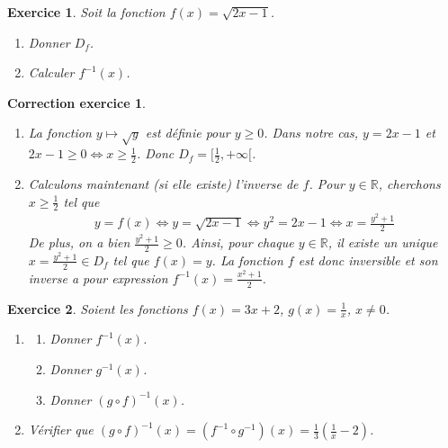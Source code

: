 \documentclass[12pt]{article}
\newtheorem{exercice}{\bf Exercice}
\newtheorem{correction}{\bf Correction exercice}
\newenvironment{exo}{
\begin{exercice}\smallskip\normalfont}{\end{exercice}
}
\newenvironment{cor}{
\begin{correction}\smallskip\normalfont}{\end{correction}
}
\newcommand*{\R}{\mathbb{R}}
\newif\ifcorrige\corrigetrue
\begin{document}


\begin{exo} Soit la fonction $f(x) = \sqrt{2x-1}$.
\begin{multicols}{2}
\begin{enumerate}
\item Donner $D_f$.
\item Calculer $f^{-1}(x)$.
\end{enumerate}
\end{multicols}
\end{exo}

\ifcorrige
\color{magenta}
\begin{cor}
  $\qquad$
\begin{enumerate}
\item La fonction $y \mapsto \sqrt{y}$ est d\'efinie pour $y \geq 0$.
  Dans notre cas, $y = 2x-1$ et $2x-1 \geq 0 \iff x \geq \frac12$.
  Donc $D_f = [ \frac12 , + \infty [$.
\item Calculons maintenant (si elle existe) l'inverse de $f$.
  Pour $y \in \R$, cherchons $x \geq \frac12$ tel que
  \begin{align*}
    y = f(x)
    \iff
    y = \sqrt{2x-1}
    \iff
    y^2 = 2x-1
    \iff
    x = \frac{y^2+1}{2}
  \end{align*}
  De plus, on a bien $\frac{y^2+1}{2} \geq 0$.
  Ainsi, pour chaque $y \in \R$, il existe un unique $x = \frac{y^2+1}{2} \in D_f$ tel que $f(x) = y$.
  La fonction $f$ est donc inversible et son inverse a pour expression $f^{-1}(x) = \frac{x^2+1}{2}$.
\end{enumerate}
\end{cor}
\color{black}
\fi


\begin{exo} Soient les fonctions $f(x) = 3x+2$, $g(x) = \frac1x$, $x \neq 0$.
\begin{enumerate}
\item 
\begin{multicols}{3}
\begin{enumerate}
\item Donner $f^{-1}(x)$.
\item Donner $g^{-1}(x)$.
\item Donner $(g \circ f)^{-1}(x)$.
\end{enumerate}
\end{multicols}
\item V\'erifier que $(g \circ f)^{-1}(x) = (f^{-1} \circ g^{-1})(x) = \frac13 (\frac1x - 2)$.
\end{enumerate}
\end{exo}
\end{document}
